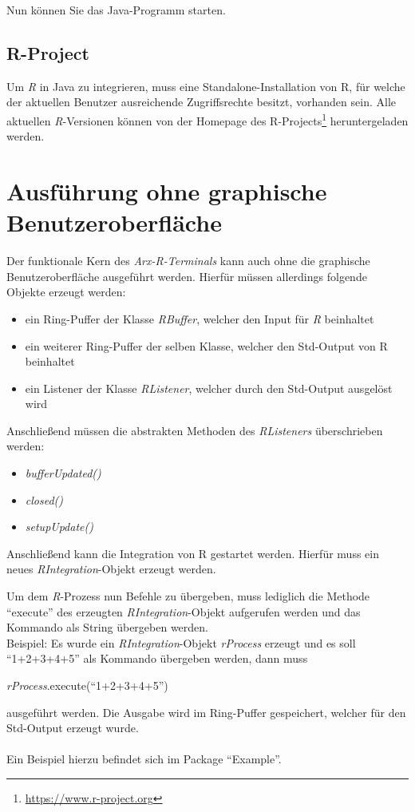 \documentclass[a4paper, 12pt]{report} %
\begin{document}
	Nun können Sie das Java-Programm starten.


\subsection{R-Project} \label{r}

Um \textit{R} in Java zu integrieren, muss eine Standalone-Installation von R, für welche der aktuellen Benutzer ausreichende Zugriffsrechte besitzt, vorhanden sein. 
Alle aktuellen \textit{R}-Versionen können von der Homepage des R-Projects\footnote{\url{https://www.r-project.org}} heruntergeladen werden. 

\section{Ausführung ohne graphische Benutzeroberfläche}

Der funktionale Kern des \textit{Arx-R-Terminals} kann auch ohne die graphische Benutzeroberfläche ausgeführt werden. Hierfür müssen allerdings folgende Objekte erzeugt werden:
\begin{itemize}
	\item ein Ring-Puffer der Klasse \textit{RBuffer}, welcher den Input für \textit{R} beinhaltet
	\item ein weiterer Ring-Puffer der selben Klasse, welcher den Std-Output von R beinhaltet
	\item ein Listener der Klasse \textit{RListener}, welcher durch den Std-Output ausgelöst wird
\end{itemize}
	
Anschließend müssen die abstrakten Methoden des \textit{RListeners} überschrieben werden:
	\begin{itemize}
		\item \textit{bufferUpdated()}
		\item \textit{closed()}
		\item \textit{setupUpdate()}
	\end{itemize}

Anschließend kann die Integration von R gestartet werden. Hierfür muss ein neues \textit{RIntegration}-Objekt erzeugt werden.


Um dem \textit{R}-Prozess nun Befehle zu übergeben, muss lediglich die Methode "`execute"' des erzeugten \textit{RIntegration}-Objekt aufgerufen werden und das Kommando als String übergeben werden.\\

Beispiel: Es wurde ein \textit{RIntegration}-Objekt \textit{rProcess} erzeugt und es soll "`1+2+3+4+5"' als Kommando übergeben werden, dann muss
	\begin{center}
		\textit{rProcess}.execute("`1+2+3+4+5"')
	\end{center} 
	ausgeführt werden. Die Ausgabe wird im Ring-Puffer gespeichert, welcher für den Std-Output erzeugt wurde.\\
\\
Ein Beispiel hierzu befindet sich im Package "`Example"'.
\end{document}
